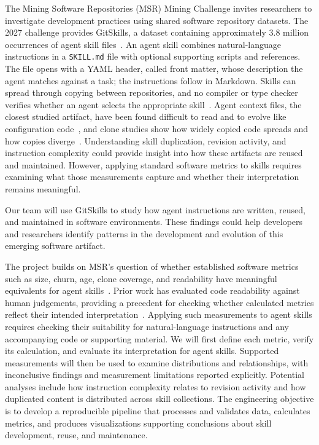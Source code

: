 \label{sec:introduction}


The Mining Software Repositories (MSR) Mining Challenge invites researchers to investigate development practices using shared software repository datasets. The 2027 challenge provides GitSkills, a dataset containing approximately 3.8 million occurrences of agent skill files~\cite{msr2027MiningChallenge}. An agent skill combines natural-language instructions in a \texttt{SKILL.md} file with optional supporting scripts and references. The file opens with a YAML header, called front matter, whose description the agent matches against a task; the instructions follow in Markdown. Skills can spread through copying between repositories, and no compiler or type checker verifies whether an agent selects the appropriate skill~\cite{msr2027MiningChallenge}. Agent context files, the closest studied artifact, have been found difficult to read and to evolve like configuration code~\cite{chatlatanagulchai2026agent}, and clone studies show how widely copied code spreads and how copies diverge~\cite{kim2005genealogies,lopes2017dejavu}. Understanding skill duplication, revision activity, and instruction complexity could provide insight into how these artifacts are reused and maintained. However, applying standard software metrics to skills requires examining what those measurements capture and whether their interpretation remains meaningful.

Our team will use GitSkills to study how agent instructions are written, reused, and maintained in software environments. These findings could help developers and researchers identify patterns in the development and evolution of this emerging software artifact.

\label{sec:project-objectives}

The project builds on MSR's question of whether established software metrics such as size, churn, age, clone coverage, and readability have meaningful equivalents for agent skills~\cite{msr2027MiningChallenge}. Prior work has evaluated code readability against human judgements, providing a precedent for checking whether calculated metrics reflect their intended interpretation~\cite{buse2010readability}. Applying such measurements to agent skills requires checking their suitability for natural-language instructions and any accompanying code or supporting material. We will first define each metric, verify its calculation, and evaluate its interpretation for agent skills. Supported measurements will then be used to examine distributions and relationships, with inconclusive findings and measurement limitations reported explicitly. Potential analyses include how instruction complexity relates to revision activity and how duplicated content is distributed across skill collections. The engineering objective is to develop a reproducible pipeline that processes and validates data, calculates metrics, and produces visualizations supporting conclusions about skill development, reuse, and maintenance.

